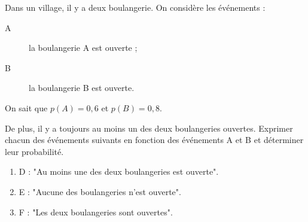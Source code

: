 
Dans un village, il y a deux boulangerie. On considère les événements : 

\begin{description}
\item[A] la boulangerie A est ouverte ;
\item[B] la boulangerie B est ouverte.
\end{description}

On sait que $p(A)=0,6$ et $p(B)=0,8$.

De plus, il y a toujours au moins un des deux boulangeries ouvertes. Exprimer chacun des événements suivants en fonction des événements A et B et déterminer leur probabilité.
\begin{enumerate}
\item D : "Au moins une des deux boulangeries est ouverte". 
\item E : "Aucune des boulangeries n'est ouverte".
\item F : "Les deux boulangeries sont ouvertes".
\end{enumerate}